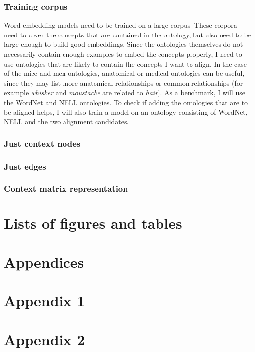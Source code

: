 \documentclass{article}
\begin{document}
 \subsubsection{Training corpus}
  Word embedding models need to be trained on a large corpus. These corpora need to cover the concepts that are contained in the ontology, but also need to be large enough to build good embeddings. Since the ontologies themselves do not necessarily contain enough examples to embed the concepts properly, I need to use ontologies that are likely to contain the concepts I want to align. In the case of the mice and men ontologies, anatomical or medical ontologies can be useful, since they may list more anatomical relationships or common relationships (for example \emph{whisker} and \emph{moustache} are related to \emph{hair}).
  As a benchmark, I will use the WordNet and NELL ontologies. To check if adding the ontologies that are to be aligned helps, I will also train a model on an ontology consisting of WordNet, NELL and the two alignment candidates.
  
  \subsubsection{Just context nodes}
  
  \subsubsection{Just edges}
  
  \subsubsection{Context matrix representation}
 
 \section{Lists of figures and tables}
 
 \newpage
 \listoffigures
 \listoftables
 
 \newpage
 
 {}
 
 
 \newpage
 \section{Appendices}
 \begin{appendices}
  \section*{Appendix 1}
  \section*{Appendix 2}
 \end{appendices}
 
 
\end{document}
